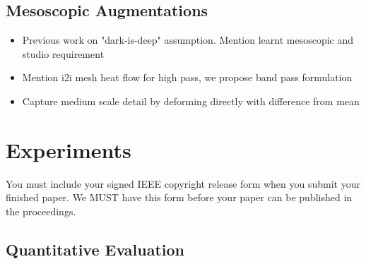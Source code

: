 \documentclass[10pt,twocolumn,letterpaper]{article}
\begin{document}



\subsection{Mesoscopic Augmentations}

\begin{itemize}
    \item Previous work on "dark-is-deep" assumption. Mention learnt mesoscopic and studio requirement
    \item Mention i2i mesh heat flow for high pass, we propose band pass formulation 
    \item Capture medium scale detail by deforming directly with difference from mean
\end{itemize}

\section{Experiments}

You must include your signed IEEE copyright release form when you submit
your finished paper. We MUST have this form before your paper can be
published in the proceedings.


\subsection{Quantitative Evaluation}
\end{document}
